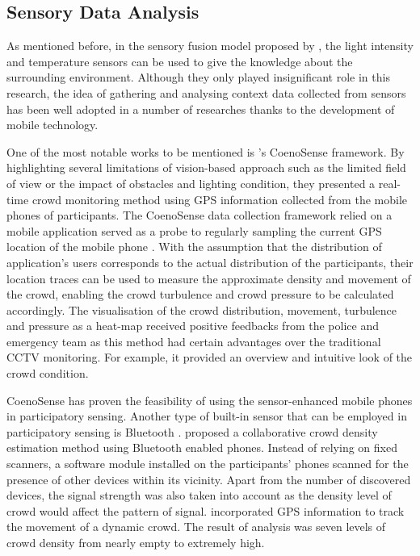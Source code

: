 \subsection{Sensory Data Analysis}
As mentioned before, in the sensory fusion model proposed by \citet{Yaseen2013}, the light intensity and temperature sensors can be used to give the knowledge about the surrounding environment. Although they only played insignificant role in this research, the idea of gathering and analysing context data collected from sensors has been well adopted in a number of researches thanks to the development of mobile technology.

One of the most notable works to be mentioned is \citet{Wirz2012}’s CoenoSense framework. By highlighting several limitations of vision-based approach such as the limited field of view or the impact of obstacles and lighting condition, they presented a real-time crowd monitoring method using GPS information collected from the mobile phones of participants. The CoenoSense data collection framework relied on a mobile application served as a probe to regularly sampling the current GPS location of the mobile phone \citep{Wirz2013}. With the assumption that the distribution of application's users corresponds to the actual distribution of the participants, their location traces can be used to measure the approximate density and movement of the crowd, enabling the crowd turbulence and crowd pressure to be calculated accordingly. The visualisation of the crowd distribution, movement, turbulence and pressure as a heat-map received positive feedbacks from the police and emergency team as this method had certain advantages over the traditional CCTV monitoring. For example, it provided an overview and intuitive look of the crowd condition.

CoenoSense has proven the feasibility of using the sensor-enhanced mobile phones in participatory sensing. Another type of built-in sensor that can be employed in participatory sensing is Bluetooth \citep{Stopczynski2013,Weppner2011,Weppner2013}. \citet{Weppner2011} proposed a collaborative crowd density estimation method using Bluetooth enabled phones. Instead of relying on fixed scanners, a software module installed on the participants’ phones scanned for the presence of other devices within its vicinity. Apart from the number of discovered devices, the signal strength was also taken into account as the density level of crowd would affect the pattern of signal. \citet{Weppner2013} incorporated GPS information to track the movement of a dynamic crowd. The result of analysis was seven levels of crowd density from nearly empty to extremely high.

